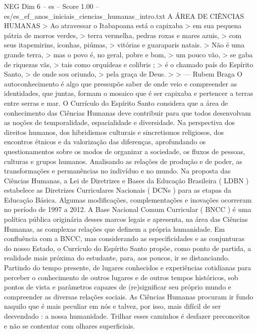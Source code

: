 \begin{textsample}{NEG Dim 6 – es – Score 1.00 – es/es\_ef\_anos\_iniciais\_ciencias\_humanas\_intro.txt}  \label{ex:f6_neg_144}
A ÁREA DE CIÊNCIAS HUMANAS > Ao atravessar o Itabapoana está o capixaba > em sua pequena pátria de morros verdes, > terra vermelha, pedras roxas e mares azuis, > com seus itapemirins, iconhas, piúmas, > vitórias e guaraparis natais. > Não é uma grande terra, > mas o povo é, no geral, pobre e bom, > um pouco vão, > se gaba de riquezas vãs, > tais como orquídeas e colibris ; > é o chamado país do Espírito Santo, > de onde sou oriundo, > pela graça de Deus. > > — Rubem Braga O autoconhecimento é algo que pressupõe saber de onde veio e compreender as identidades, que juntas, formam o mosaico que é ser capixaba e pertencer a terras entre serras e mar.
O Currículo do Espírito Santo considera que a área de conhecimento das Ciências Humanas deve contribuir para que todos desenvolvam as noções de temporalidade, espacialidade e diversidade.
Na perspectiva dos direitos humanos, dos hibridismos culturais e sincretismos religiosos, dos encontros étnicos e da valorização das diferenças, aprofundando os questionamentos sobre os modos de organizar a sociedade, os fluxos de pessoas, culturas e grupos humanos.
Analisando as relações de produção e de poder, as transformações e permanências no indivíduo e no mundo.
Na proposta das Ciências Humanas, a Lei de Diretrizes e Bases da Educação Brasileira ( LDBN ) estabelece as Diretrizes Curriculares Nacionais ( DCNs ) para as etapas da Educação Básica.
Algumas modificações, complementações e inovações ocorreram no período de 1997 a 2012.
A Base Nacional Comum Curricular ( BNCC ) é uma política pública originária desses marcos legais e apresenta, na área das Ciências Humanas, as complexas relações que definem a própria humanidade.
Em confluência com a BNCC, mas considerando as especificidades e as conjunturas do nosso Estado, o Currículo do Espírito Santo propõe, como ponto de partida, a realidade mais próxima do estudante, para, aos poucos, ir se distanciando.
Partindo do tempo presente, de lugares conhecidos e experiências cotidianas para perceber o conhecimento de outros lugares e de outros tempos históricos, sob pontos de vista e parâmetros capazes de (re)significar seu próprio mundo e compreender as diversas relações sociais.
As Ciências Humanas procuram ir fundo naquilo que é mais peculiar em nós e talvez, por isso, mais difícil de ser desvendado : a nossa humanidade.
Trilhar esses caminhos é desfazer preconceitos e não se contentar com olhares superficiais.

\end{textsample}

